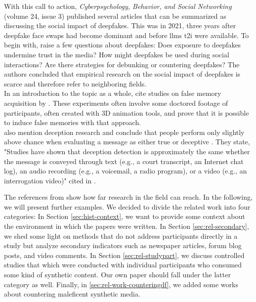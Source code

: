 \documentclass[
  a4paper,  %
  twoside,  %
  bibliography=totoc,
  headsepline,
  cleardoublepage=empty,
  parskip=half,
  draft=false
]{scrbook}
\begin{document}
With this call to action, \textit{Cyberpsychology, Behavior, and Social Networking} (volume 24, issue 3) published several articles that can be summarized as discussing the social impact of deepfakes. This was in 2021, three years after deepfake face swaps had become dominant and before \gls{llm}s \gls{t2i} were available. To begin with, \citet{hancockSocialImpactDeepfakes2021} raise a few questions about deepfakes: Does exposure to deepfakes undermine trust in the media? How might deepfakes be used during social interactions? Are there strategies for debunking or countering deepfakes? The authors concluded that empirical research on the social impact of deepfakes is scarce and therefore refer to neighboring fields. \\
In an introduction to the topic as a whole, \citet{hancockSocialImpactDeepfakes2021} cite studies on false memory acquisition by \citet{garryActuallyPictureWorth2005}. These experiments often involve some doctored footage of participants, often created with 3D animation tools, and prove that it is possible to induce false memories with that approach. \\
\citet{hancockSocialImpactDeepfakes2021} also mention deception research and conclude that people perform only slightly above chance when evaluating a message as either true or deceptive \cite{bondAccuracyDeceptionJudgments2006}. They state, "Studies have shown that deception detection is approximately the same whether the message is conveyed through text (e.g., a court transcript, an Internet chat log), an audio recording (e.g., a voicemail, a radio program), or a video (e.g., an interrogation video)" \cite{hancockSeeNoEvil2010} cited in \cite{hancockSocialImpactDeepfakes2021}.

The references from \citet{hancockSocialImpactDeepfakes2021} show how far research in the field can reach. In the following, we will present further examples. We decided to divide the related work into four categories: In Section \ref{sec:hist-context}, we want to provide some context about the environment in which the papers were written. In Section \ref{sec:rel-secondary}, we shed some light on methods that do not address participants directly in a study but analyze secondary indicators such as newspaper articles, forum blog posts, and video comments. In Section \ref{sec:rel-studypart}, we discuss controlled studies that which were conducted with individual participants who consumed some kind of synthetic content. Our own paper should fall under the latter category as well. Finally, in \ref{sec:rel-work-counteringdf}, we added some works about countering maleficent synthetic media.
\end{document}
